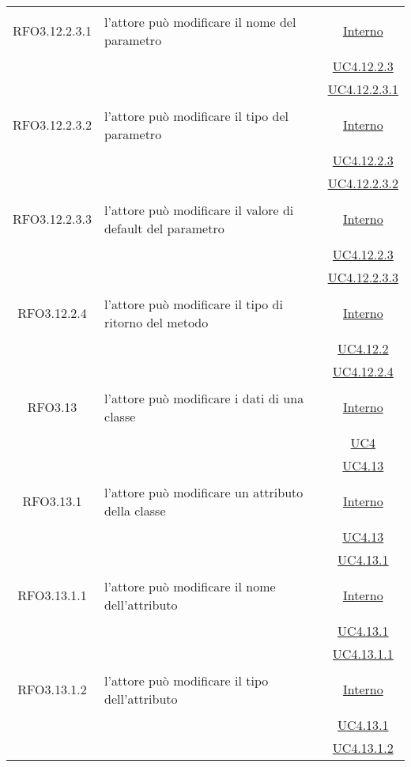 \begin{longtable}{|c|>{\centering}m{7cm}|c|}
\hypertarget{RFO3.12.2.3.1}{RFO3.12.2.3.1} & l'attore può modificare il nome del parametro & \hyperlink{Interno}{Interno}\\
& &\hyperref[UC4.12.2.3]{UC4.12.2.3}\\
& &\hyperref[UC4.12.2.3.1]{UC4.12.2.3.1}\\ \hline

\hypertarget{RFO3.12.2.3.2}{RFO3.12.2.3.2} & l'attore può modificare il tipo del parametro & \hyperlink{Interno}{Interno}\\
& &\hyperref[UC4.12.2.3]{UC4.12.2.3}\\
& &\hyperref[UC4.12.2.3.2]{UC4.12.2.3.2}\\ \hline

\hypertarget{RFO3.12.2.3.3}{RFO3.12.2.3.3} & l'attore può modificare il valore di default del parametro & \hyperlink{Interno}{Interno}\\
& &\hyperref[UC4.12.2.3]{UC4.12.2.3}\\
& &\hyperref[UC4.12.2.3.3]{UC4.12.2.3.3}\\ \hline

\hypertarget{RFO3.12.2.4}{RFO3.12.2.4} & l'attore può modificare il tipo di ritorno del metodo & \hyperlink{Interno}{Interno}\\
& &\hyperref[UC4.12.2]{UC4.12.2}\\
& &\hyperref[UC4.12.2.4]{UC4.12.2.4}\\ \hline

\hypertarget{RFO3.13}{RFO3.13} & l'attore può modificare i dati di una classe & \hyperlink{Interno}{Interno}\\
& &\hyperref[UC4]{UC4}\\
& &\hyperref[UC4.13]{UC4.13}\\ \hline

\hypertarget{RFO3.13.1}{RFO3.13.1} & l'attore può modificare un attributo della classe & \hyperlink{Interno}{Interno}\\
& &\hyperref[UC4.13]{UC4.13}\\
& &\hyperref[UC4.13.1]{UC4.13.1}\\ \hline

\hypertarget{RFO3.13.1.1}{RFO3.13.1.1} & l'attore può modificare il nome dell'attributo & \hyperlink{Interno}{Interno}\\
& &\hyperref[UC4.13.1]{UC4.13.1}\\
& &\hyperref[UC4.13.1.1]{UC4.13.1.1}\\ \hline

\hypertarget{RFO3.13.1.2}{RFO3.13.1.2} & l'attore può modificare il tipo dell'attributo & \hyperlink{Interno}{Interno}\\
& &\hyperref[UC4.13.1]{UC4.13.1}\\
& &\hyperref[UC4.13.1.2]{UC4.13.1.2}\\ \hline


\end{longtable}
